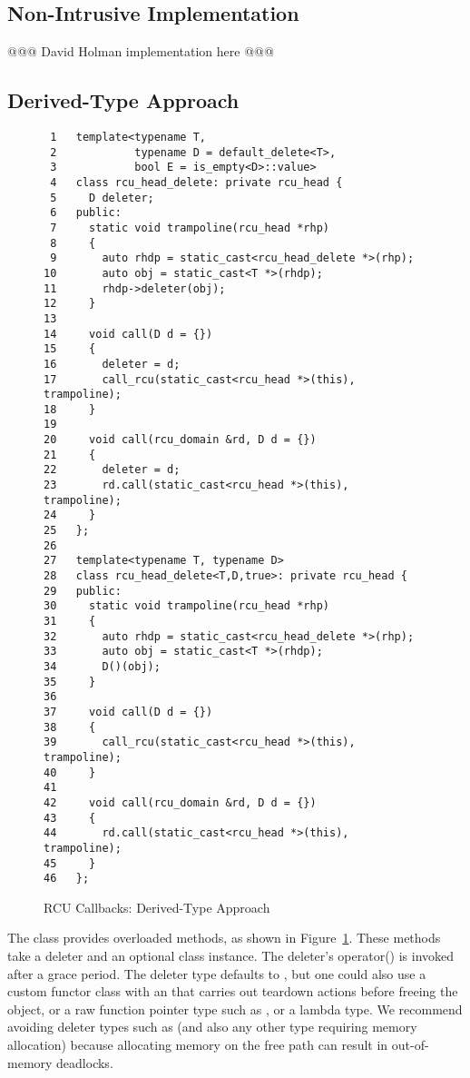 \documentclass[letterpaper,10pt]{article}
\begin{document}
\subsection{Non-Intrusive Implementation}
\label{sec:Non-Intrusive Implementation}

@@@ David Holman implementation here @@@

\subsection{Derived-Type Approach}
\label{sec:Derived-Type Approach}

\begin{figure}[tbp]
{ \scriptsize
\begin{verbatim}
 1   template<typename T,
 2            typename D = default_delete<T>,
 3            bool E = is_empty<D>::value>
 4   class rcu_head_delete: private rcu_head {
 5     D deleter;
 6   public:
 7     static void trampoline(rcu_head *rhp)
 8     {
 9       auto rhdp = static_cast<rcu_head_delete *>(rhp);
10       auto obj = static_cast<T *>(rhdp);
11       rhdp->deleter(obj);
12     }
13
14     void call(D d = {})
15     {
16       deleter = d;
17       call_rcu(static_cast<rcu_head *>(this), trampoline);
18     }
19
20     void call(rcu_domain &rd, D d = {})
21     {
22       deleter = d;
23       rd.call(static_cast<rcu_head *>(this), trampoline);
24     }
25   };
26
27   template<typename T, typename D>
28   class rcu_head_delete<T,D,true>: private rcu_head {
29   public:
30     static void trampoline(rcu_head *rhp)
31     {
32       auto rhdp = static_cast<rcu_head_delete *>(rhp);
33       auto obj = static_cast<T *>(rhdp);
34       D()(obj);
35     }
36
37     void call(D d = {})
38     {
39       call_rcu(static_cast<rcu_head *>(this), trampoline);
40     }
41
42     void call(rcu_domain &rd, D d = {})
43     {
44       rd.call(static_cast<rcu_head *>(this), trampoline);
45     }
46   };
\end{verbatim}
}
\caption{RCU Callbacks: Derived-Type Approach}
\label{fig:RCU Callbacks: Derived-Type Approach}
\end{figure}

The  class provides overloaded  methods,
as shown in
Figure~\ref{fig:RCU Callbacks: Derived-Type Approach}.
These methods take a deleter and an optional
 class instance.
The deleter's operator() is invoked after a grace period.
The deleter type defaults to ,
but one could also use a
custom functor class with an  that carries out teardown actions
before freeing the object, or a raw function pointer type such as
, or a lambda type.
We recommend avoiding deleter types such as 
(and also any other type requiring memory allocation) because
allocating memory on the free path can result in out-of-memory deadlocks.
\end{document}
